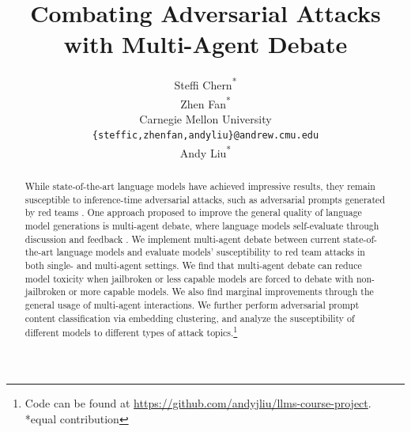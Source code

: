\documentclass[11pt]{article}
\title{Combating Adversarial Attacks with Multi-Agent Debate}
\author{Steffi Chern\textsuperscript{\rm{*}} \\\And Zhen Fan\textsuperscript{\rm{*}} \\Carnegie Mellon University \\\texttt{\{steffic,zhenfan,andyliu\}@andrew.cmu.edu}
\\\And Andy Liu\textsuperscript{\rm{*}}
}
\begin{document}
\maketitle
\begin{abstract}

While state-of-the-art language models have achieved impressive results, they remain susceptible to inference-time adversarial attacks, such as adversarial prompts generated by red teams \citep{ganguli2022red}. One approach proposed to improve the general quality of language model generations is multi-agent debate, where language models self-evaluate through discussion and feedback \citep{du2023}. We implement multi-agent debate between current state-of-the-art language models and evaluate models' susceptibility to red team attacks in both single- and multi-agent settings. We find that multi-agent debate can reduce model toxicity when jailbroken or less capable models are forced to debate with non-jailbroken or more capable models. We also find marginal improvements through the general usage of multi-agent interactions. We further perform adversarial prompt content classification via embedding clustering, and analyze the susceptibility of different models to different types of attack topics.\footnote{Code can be found at \url{https://github.com/andyjliu/llms-course-project}. *equal contribution}
\end{abstract}








\end{document}
